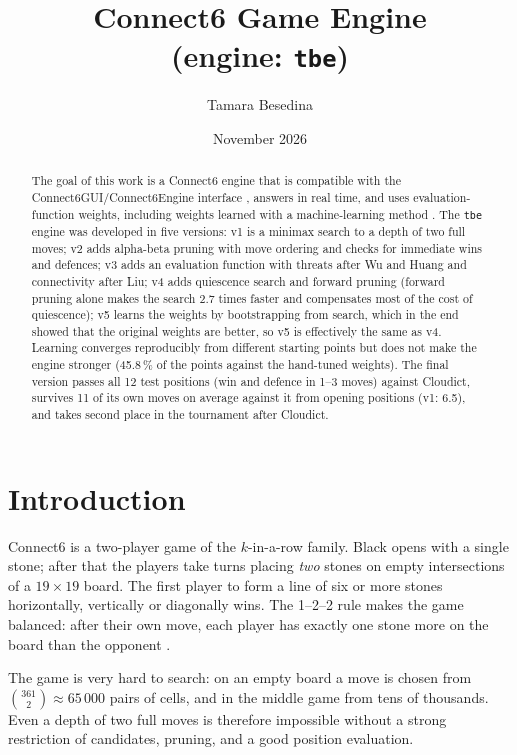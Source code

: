 \documentclass[a4paper,10pt,twocolumn]{article}
\title{\textbf{Connect6 Game Engine}\\[0.3em]\large (engine: \texttt{tbe})}
\author{Tamara Besedina}
\date{November 2026}
\newcommand{\code}[1]{\texttt{#1}}
\begin{document}
\maketitle
\begin{abstract}
\noindent
The goal of this work is a Connect6 engine that is compatible with the Connect6GUI/\allowbreak{}Connect6Engine interface \citep{connect6gui}, answers in real time, and uses evaluation-function weights, including weights learned with a machine-learning method \citep{statement}. The \code{tbe} engine was developed in five versions: v1 is a minimax search to a depth of two full moves; v2 adds alpha-beta pruning with move ordering and checks for immediate wins and defences; v3 adds an evaluation function with threats after Wu and Huang and connectivity after Liu; v4 adds quiescence search and forward pruning (forward pruning alone makes the search 2.7 times faster and compensates most of the cost of quiescence); v5 learns the weights by bootstrapping from search, which in the end showed that the original weights are better, so v5 is effectively the same as v4. Learning converges reproducibly from different starting points but does not make the engine stronger (45.8\,\% of the points against the hand-tuned weights). The final version passes all 12 test positions (win and defence in 1--3 moves) against Cloudict, survives 11 of its own moves on average against it from opening positions (v1: 6.5), and takes second place in the tournament after Cloudict.
\end{abstract}

\section{Introduction}

Connect6 is a two-player game of the $k$-in-a-row family. Black opens with a single stone; after that the players take turns placing \emph{two} stones on empty intersections of a $19\times19$ board. The first player to form a line of six or more stones horizontally, vertically or diagonally wins. The 1--2--2 rule makes the game balanced: after their own move, each player has exactly one stone more on the board than the opponent \citep{wu2005family}.

The game is very hard to search: on an empty board a move is chosen from $\binom{361}{2}\approx 65\,000$ pairs of cells, and in the middle game from tens of thousands. Even a depth of two full moves is therefore impossible without a strong restriction of candidates, pruning, and a good position evaluation.
\end{document}
